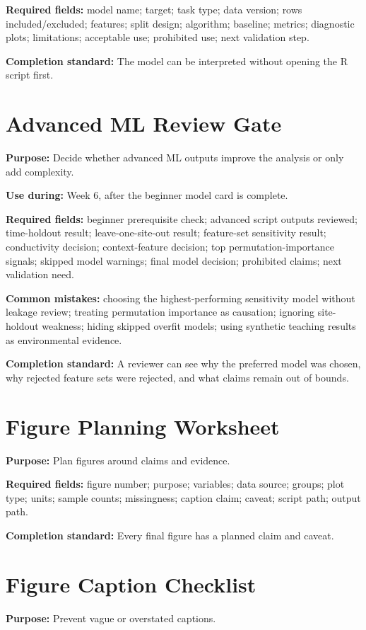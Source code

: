 \textbf{Required fields:} model name; target; task type; data version; rows included/excluded; features; split design; algorithm; baseline; metrics; diagnostic plots; limitations; acceptable use; prohibited use; next validation step.

\textbf{Completion standard:} The model can be interpreted without opening the R script first.

\section{Advanced ML Review Gate}
\textbf{Purpose:} Decide whether advanced ML outputs improve the analysis or only add complexity.

\textbf{Use during:} Week 6, after the beginner model card is complete.

\textbf{Required fields:} beginner prerequisite check; advanced script outputs reviewed; time-holdout result; leave-one-site-out result; feature-set sensitivity result; conductivity decision; context-feature decision; top permutation-importance signals; skipped model warnings; final model decision; prohibited claims; next validation need.

\textbf{Common mistakes:} choosing the highest-performing sensitivity model without leakage review; treating permutation importance as causation; ignoring site-holdout weakness; hiding skipped overfit models; using synthetic teaching results as environmental evidence.

\textbf{Completion standard:} A reviewer can see why the preferred model was chosen, why rejected feature sets were rejected, and what claims remain out of bounds.

\section{Figure Planning Worksheet}
\textbf{Purpose:} Plan figures around claims and evidence.

\textbf{Required fields:} figure number; purpose; variables; data source; groups; plot type; units; sample counts; missingness; caption claim; caveat; script path; output path.

\textbf{Completion standard:} Every final figure has a planned claim and caveat.

\section{Figure Caption Checklist}
\textbf{Purpose:} Prevent vague or overstated captions.

